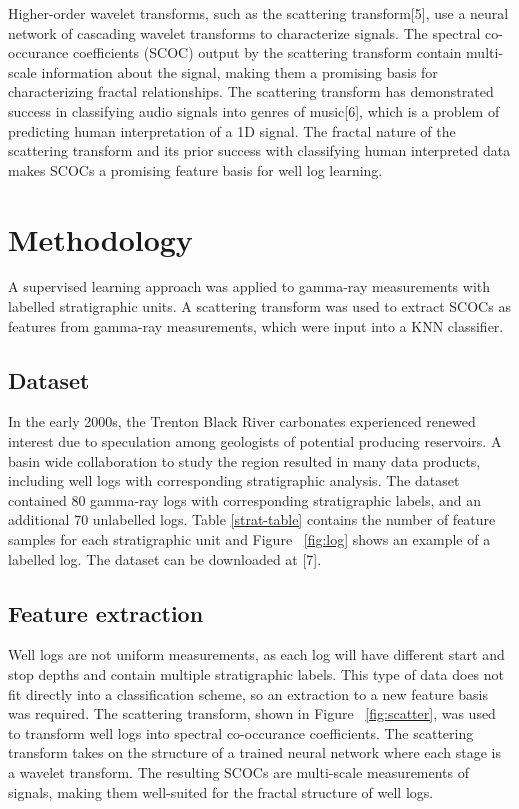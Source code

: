 \documentclass{article} %
\begin{document}
Higher-order wavelet transforms, such as the scattering transform[5],
use a neural network of cascading wavelet transforms to characterize
signals. The spectral co-occurance coefficients (SCOC) output by the
scattering transform contain multi-scale information about the signal,
making them a promising basis for characterizing fractal relationships.
The scattering transform has demonstrated success in classifying audio signals
into genres of music[6], which is a problem of predicting human
interpretation of a 1D signal. The fractal nature of the scattering
transform and its prior success with classifying human interpreted data
makes SCOCs a promising feature basis for well log learning.


\section{Methodology}
A supervised learning approach was applied to gamma-ray measurements
with labelled stratigraphic units. A scattering transform was used to
extract SCOCs as features from gamma-ray measurements, which were 
input into a KNN classifier. 

\subsection{Dataset}
In the early 2000s, the Trenton Black River carbonates experienced renewed interest due to
speculation among geologists of potential producing reservoirs. A basin
wide collaboration to study the region resulted in many data products,
including well logs with corresponding stratigraphic analysis. The
dataset  contained 80 gamma-ray logs with
corresponding stratigraphic labels, and an additional 70 unlabelled
logs. Table \ref{strat-table} contains the number of feature samples
for each stratigraphic unit and Figure ~\ref{fig:log} shows an example
of a labelled log. The dataset can be downloaded at [7].

\subsection{Feature extraction}
Well logs are not uniform measurements, as each log will have
different start and stop depths and contain multiple stratigraphic
labels. This type of data does not fit  directly into a classification scheme, so an extraction
to a new feature basis was required. The scattering transform, shown
in Figure ~\ref{fig:scatter}, was used to transform well logs into
spectral co-occurance coefficients. The scattering transform takes on the
structure of a trained neural network where each
stage is a wavelet transform. The resulting SCOCs are multi-scale
measurements of signals, making them well-suited for the fractal
structure of well logs. 
\end{document}
